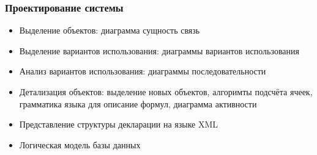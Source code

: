 \documentclass[xcolor=pdftex, dvipsnames, table]{beamer}
\begin{document}
\begin{frame}
  \frametitle{Проектирование системы}
  \begin{itemize}
    \item Выделение объектов: диаграмма сущность связь
    \item Выделение вариантов использования: диаграммы вариантов использования
    \item Анализ вариантов использования: диаграммы последовательности
    \item Детализация объектов: выделение новых объектов, алгоримты подсчёта ячеек, грамматика языка для описание формул, диаграмма активности
    \item Представление структуры декларации на языке XML
    \item Логическая модель базы данных
  \end{itemize}
\end{frame}
\end{document}
